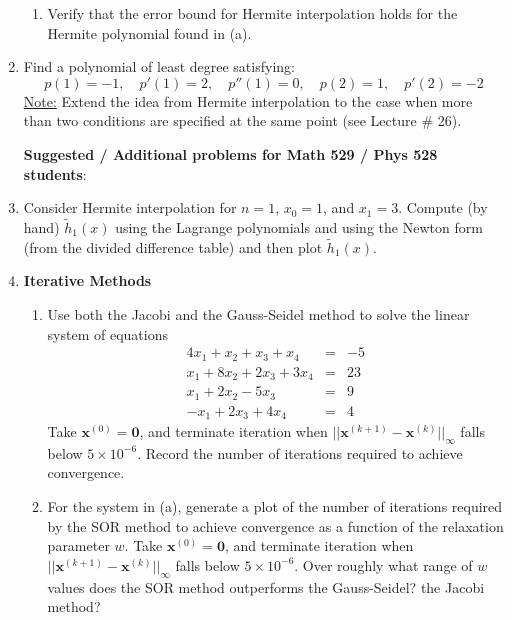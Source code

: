 \documentclass [12pt]{article}
\begin{document}
\begin{enumerate}
\begin{enumerate}
\item Verify that the error bound for Hermite interpolation holds
for the Hermite polynomial found in (a). %

\end{enumerate}

\item Find a polynomial of least degree satisfying: 
%
\[
p(1)=-1, \quad p'(1)=2, \quad p''(1)=0, \quad p(2)=1, \quad p'(2)=-2
\]
%
\underline{Note:} Extend the idea from Hermite interpolation to the case when more than two conditions are specified at the same point (see Lecture \# 26).

\bigskip

{\bf Suggested  /  Additional problems for Math 529 / Phys 528 students}:

\item Consider Hermite interpolation for $n=1$, $x_{0}=1$, and
$x_{1}=3$. Compute (by hand) $\tilde{h}_{1}(x)$ using the Lagrange
polynomials and using the Newton form (from the divided difference
table) and then plot $\tilde{h}_{1}(x)$.



\item  {\bf  Iterative Methods}

\begin{enumerate}

\item Use both the Jacobi and the Gauss-Seidel method to solve the linear system of equations
%
\begin{eqnarray}
4x_1+x_2+x_3+x_4 & = & -5 \nonumber \\
x_1+8x_2+2x_3 +3x_4&=& 23 \nonumber \\
x_1+2x_2-5x_3  &=& 9 \nonumber \\
-x_1+2x_3+4x_4 &= & 4 \nonumber 
\end{eqnarray}
%
Take ${\mathbf x}^{(0)}={\mathbf 0}$, and terminate iteration when $||{\mathbf x}^{(k+1)}-{\mathbf x}^{(k)}||_\infty$ falls below $5\times 10^{-6}$. Record the number of iterations required to achieve convergence.

\item For the system in (a), generate a plot of the number of iterations required by the SOR method to achieve convergence as a function of the relaxation parameter $w$. Take ${\mathbf x}^{(0)}={\mathbf 0}$, and terminate iteration when $||{\mathbf x}^{(k+1)}-{\mathbf x}^{(k)}||_\infty$ falls below $5\times 10^{-6}$. Over roughly what range of  $w$ values does the SOR method outperforms the Gauss-Seidel? the Jacobi method?


\end{enumerate}
\end{enumerate}
\end{document}
